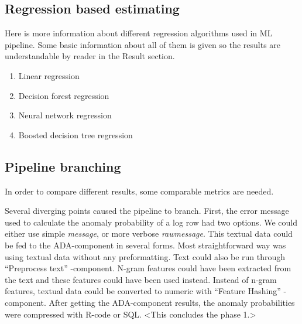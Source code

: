

\subsection{Regression based estimating}\label{subsec:pipe-regression-estimating}
\begin{itcomment}
    Here is more information about different regression algorithms
    used in ML pipeline.
    Some basic information about all of them is given so the results are understandable
    by reader in the Result section.
\end{itcomment}

\begin{enumerate}
    \item Linear regression
    \item Decision forest regression
    \item Neural network regression
    \item Boosted decision tree regression
\end{enumerate}




\subsection{Pipeline branching}\label{subsec:pipe-branching}

In order to compare different results,
some comparable metrics are needed.

Several diverging points caused the pipeline to branch.
First,
the error message used to calculate the anomaly probability of a log row
had two options.
We could either use simple \textit{message},
or more verbose \textit{rawmessage}.
This textual data could be fed to the ADA-component in several forms.
Most straightforward way was using textual data without any preformatting.
Text could also be run through \enquote{Preprocess text} -component. %
N-gram features could have been extracted from the text
and these features could have been used instead.
Instead of n-gram features,
textual data could be converted to numeric
with \enquote{Feature Hashing} -component.
After getting the ADA-component results,
the anomaly probabilities were compressed with R-code or SQL. %
<This concludes the phase 1.> %

